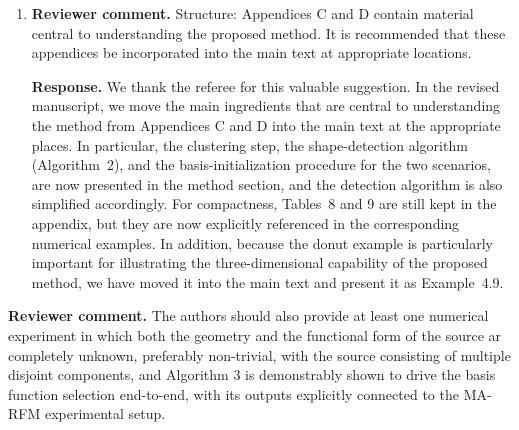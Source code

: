 \documentclass[11pt]{article}
\newcommand{\reviewer}[1]{\vspace{0.4em}\noindent\textbf{Reviewer comment.} #1}
\newcommand{\response}[1]{\vspace{0.2em}\noindent\textbf{Response.} #1}
\begin{document}
\begin{enumerate}[label=(\alph*)]
\item \reviewer{Structure: Appendices C and D contain material central to understanding the proposed method. It is recommended that these appendices be incorporated into the main text at appropriate locations.}

\response{We thank the referee for this valuable suggestion. 
In the revised manuscript, we move the main ingredients that are central to understanding the method from Appendices C and D into the main text at the appropriate places. 
In particular, the clustering step, the shape-detection algorithm (Algorithm~2), and the basis-initialization procedure for the two scenarios, are now presented in the method section,
 and the detection algorithm is also simplified accordingly. For compactness, Tables~8 and 9 are still kept in the appendix, but they are now explicitly referenced in the corresponding numerical examples. 
 In addition, because the donut example is particularly important for illustrating the three-dimensional capability of the proposed method, we have moved it into the main text and present it as Example~4.9.}
\end{enumerate}

\reviewer{The authors should also provide at least one numerical
experiment in which both the geometry and the functional form of the source ar completely unknown, preferably non-trivial, with the source consisting of multiple
disjoint components, and Algorithm 3 is demonstrably shown to drive the basis
function selection end-to-end, with its outputs explicitly connected to the MA-RFM
experimental setup. }
\end{document}

